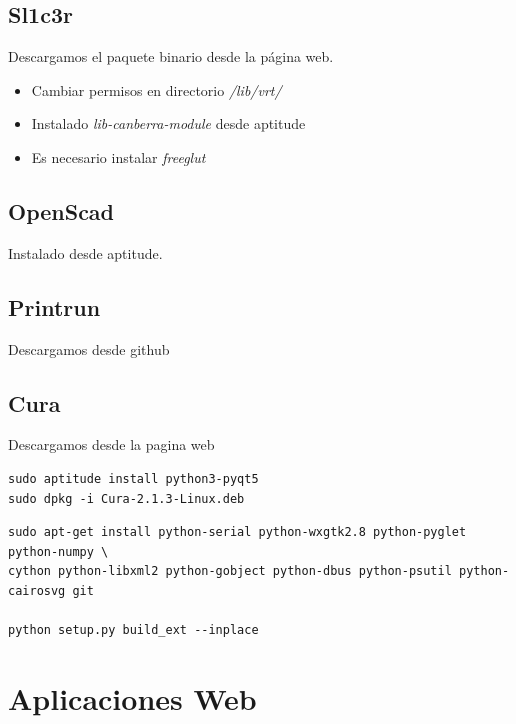 \documentclass[12pt,spanish,]{scrartcl}
\providecommand{\tightlist}{%
  \setlength{\itemsep}{0pt}\setlength{\parskip}{0pt}}
\begin{document}
\hypertarget{sl1c3r}{%
\subsection{Sl1c3r}\label{sl1c3r}}

Descargamos el paquete binario desde la página web.

\begin{itemize}
\tightlist
\item
  Cambiar permisos en directorio \emph{/lib/vrt/}
\item
  Instalado \emph{lib-canberra-module} desde aptitude
\item
  Es necesario instalar \emph{freeglut}
\end{itemize}

\hypertarget{openscad}{%
\subsection{OpenScad}\label{openscad}}

Instalado desde aptitude.

\hypertarget{printrun}{%
\subsection{Printrun}\label{printrun}}

Descargamos desde github

\hypertarget{cura}{%
\subsection{Cura}\label{cura}}

Descargamos desde la pagina web

\begin{verbatim}
sudo aptitude install python3-pyqt5
sudo dpkg -i Cura-2.1.3-Linux.deb
\end{verbatim}

\begin{verbatim}
sudo apt-get install python-serial python-wxgtk2.8 python-pyglet python-numpy \
cython python-libxml2 python-gobject python-dbus python-psutil python-cairosvg git

python setup.py build_ext --inplace
\end{verbatim}

\hypertarget{aplicaciones-web}{%
\section{Aplicaciones Web}\label{aplicaciones-web}}
\end{document}
